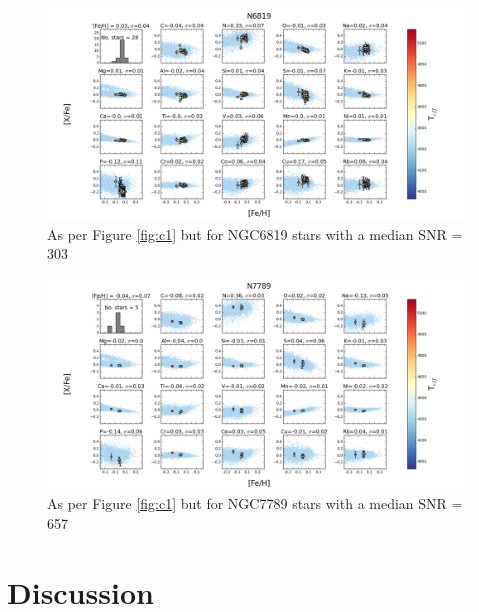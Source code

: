 \documentclass[14pt, preprint2]{aastex6}
\begin{document}
\begin{figure}
\centering
        \includegraphics[scale=0.5]{20elem-2_tc2_nofilt.png}
  \caption{As per Figure \ref{fig:c1} but for NGC6819 stars with a median SNR = 303 } %
\label{fig:c7}
\end{figure}

\begin{figure}
\centering
  \includegraphics[scale=0.5]{20elem-1_tc2_nofilt.png}
  \caption{As per Figure \ref{fig:c1} but for NGC7789 stars with a median SNR = 657 } %
\label{fig:c8}
\end{figure}



\section{Discussion}
\end{document}

